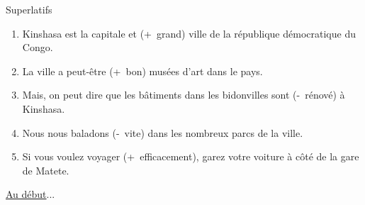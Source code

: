 \begin{frame}{Superlatifs}
  \begin{enumerate}
    \item Kinshasa est la capitale et \underline{} (+~grand) ville de la république démocratique du Congo.
    \item La ville a peut-être \underline{} (+~bon) musées d'art dans le pays.
    \item Mais, on peut dire que les bâtiments dans les bidonvilles sont \underline{} (-~rénové) à Kinshasa.
    \item Nous nous baladons \underline{} (-~vite) dans les nombreux parcs de la ville.
    \item Si vous voulez voyager \underline{} (+~efficacement), garez votre voiture à côté de la gare de Matete.
  \end{enumerate}
  \raggedleft
  \hyperlink{début}{Au début}...
\end{frame}